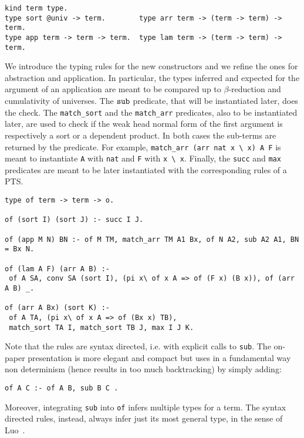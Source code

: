 \documentclass{easychair}
\begin{document}
\begin{Verbatim}
kind term type.
type sort @univ -> term.        type arr term -> (term -> term) -> term.
type app term -> term -> term.  type lam term -> (term -> term) -> term.
\end{Verbatim}

We introduce the typing rules for the new constructors and we refine the
ones for abstraction and application. In particular, the types inferred and
expected for the argument of an application are meant to be compared up to $\beta$-reduction and cumulativity of universes. The $\verb+sub+$ predicate, that will be instantiated later, does the check. The \verb+match_sort+ and the \verb+match_arr+ predicates, also to be instantiated later, are used to check if the weak head normal form of the first argument is respectively a sort or a dependent product. In both cases the sub-terms are returned by the predicate. For example, \verb+match_arr (arr nat x \ x) A F+ is meant to instantiate \verb+A+ with \verb+nat+ and \verb+F+ with \verb+x \ x+. Finally, the \verb+succ+ and \verb+max+ predicates are meant to be later instantiated with the corresponding rules of a PTS.

\begin{Verbatim}
type of term -> term -> o.

of (sort I) (sort J) :- succ I J.

of (app M N) BN :- of M TM, match_arr TM A1 Bx, of N A2, sub A2 A1, BN = Bx N.

of (lam A F) (arr A B) :-
 of A SA, conv SA (sort I), (pi x\ of x A => of (F x) (B x)), of (arr A B) _.

of (arr A Bx) (sort K) :-
 of A TA, (pi x\ of x A => of (Bx x) TB),
 match_sort TA I, match_sort TB J, max I J K.
\end{Verbatim}

Note that the rules are syntax directed, i.e. with explicit calls to
\verb+sub+.  The on-paper presentation is more elegant and compact but 
uses in a fundamental way non determinism (hence results in too much
backtracking) by simply adding:

\begin{Verbatim}
of A C :- of A B, sub B C .
\end{Verbatim}

Moreover, integrating \verb+sub+ into \verb+of+ infers multiple types for a term. The syntax directed rules, instead, always infer just its most general type, in the sense of Luo~\cite{ecc}.
\end{document}
